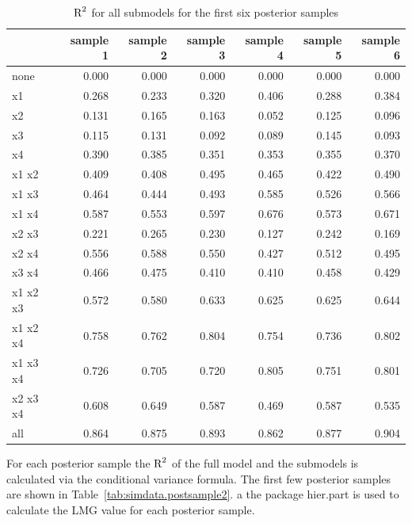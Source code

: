 \documentclass[11pt,a4paper,twoside]{book}\usepackage[]{graphicx}\usepackage[]{color}
\newenvironment{knitrout}{}{} %
\begin{document}
\begin{knitrout}
\color{fgcolor}\begin{table}

\caption{\label{tab:simdata.postsample3}$ \text{R}^2$ for all submodels for the first six posterior samples}
\centering
\begin{tabular}[t]{lrrrrrr}
\toprule
  & sample 1 & sample 2 & sample 3 & sample 4 & sample 5 & sample 6\\
\midrule
none & 0.000 & 0.000 & 0.000 & 0.000 & 0.000 & 0.000\\
x1 & 0.268 & 0.233 & 0.320 & 0.406 & 0.288 & 0.384\\
x2 & 0.131 & 0.165 & 0.163 & 0.052 & 0.125 & 0.096\\
x3 & 0.115 & 0.131 & 0.092 & 0.089 & 0.145 & 0.093\\
x4 & 0.390 & 0.385 & 0.351 & 0.353 & 0.355 & 0.370\\
x1 x2 & 0.409 & 0.408 & 0.495 & 0.465 & 0.422 & 0.490\\
x1 x3 & 0.464 & 0.444 & 0.493 & 0.585 & 0.526 & 0.566\\
x1 x4 & 0.587 & 0.553 & 0.597 & 0.676 & 0.573 & 0.671\\
x2 x3 & 0.221 & 0.265 & 0.230 & 0.127 & 0.242 & 0.169\\
x2 x4 & 0.556 & 0.588 & 0.550 & 0.427 & 0.512 & 0.495\\
x3 x4 & 0.466 & 0.475 & 0.410 & 0.410 & 0.458 & 0.429\\
x1 x2 x3 & 0.572 & 0.580 & 0.633 & 0.625 & 0.625 & 0.644\\
x1 x2 x4 & 0.758 & 0.762 & 0.804 & 0.754 & 0.736 & 0.802\\
x1 x3 x4 & 0.726 & 0.705 & 0.720 & 0.805 & 0.751 & 0.801\\
x2 x3 x4 & 0.608 & 0.649 & 0.587 & 0.469 & 0.587 & 0.535\\
all & 0.864 & 0.875 & 0.893 & 0.862 & 0.877 & 0.904\\
\bottomrule
\end{tabular}
\end{table}


\end{knitrout}

For each posterior sample the $\text{R}^2$ of the full model and the submodels is calculated via the conditional variance formula. The first few posterior samples are shown in Table~\ref{tab:simdata.postsample2}.  a the package hier.part is used to calculate the LMG value for each posterior sample.
\end{document}
